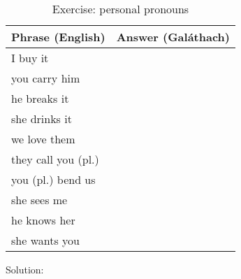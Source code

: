 \begin{table}[H]
\centering
\begin{tabu}{|l|p{10.0cm}|}
  \toprule
  \textbf{Phrase (English)} & \textbf{Answer (Gal\'{a}thach)}\\
  \toprule
  I buy it & \\
  \midrule
  you carry him & \\
  \midrule
  he breaks it & \\
  \midrule
  she drinks it & \\
  \midrule
  we love them & \\
  \midrule
  they call you (pl.) & \\
  \midrule
  you (pl.) bend us & \\
  \midrule
  she sees me & \\
  \midrule
  he knows her & \\
  \midrule
  she wants you & \\
  \bottomrule
\end{tabu}
\label{exercises_personal_pronouns}
\caption{Exercise: personal pronouns}
\end{table}

\noindent Solution:\\
\begin{table}[H]
\centering
{}
\label{solution_personal_pronouns}
\caption{Solution: personal pronouns}
\end{table}

